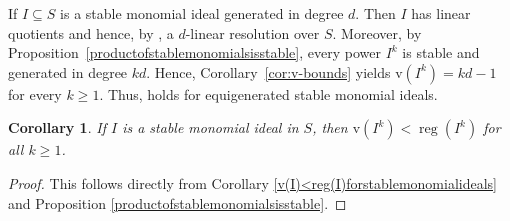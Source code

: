 \documentclass[11pt,reqno,a4paper]{amsart}
\newtheorem{corollary}[theorem]{Corollary}
\theoremstyle{definition}
\begin{document}
\noindent 


If $I\subseteq S$ is a stable monomial ideal generated in degree $d$. Then $I$ has linear quotients and hence, by \cite[Lemma~4.1]{ConcaHerzog03}, a $d$-linear resolution over $S$. Moreover, by Proposition~\ref{productofstablemonomialsisstable}, every power $I^k$ is stable and generated in degree $kd$. Hence, Corollary~\ref{cor:v-bounds} yields $\mathrm{v}(I^k)=kd-1$ for every $k\geq1$. Thus, \cite[Conjecture~2.6]{Ficarra24} holds for equigenerated stable monomial ideals.


\begin{corollary}
If \(I\) is a stable monomial ideal in $S$, then \(\mathrm{v}(I^k) < \operatorname{reg}(I^k)\) for all \(k \ge 1\).
\end{corollary}

\begin{proof}
This follows directly from Corollary \ref{v(I)<reg(I)forstablemonomialideals} and Proposition \ref{productofstablemonomialsisstable}.

\end{proof}
\end{document}
